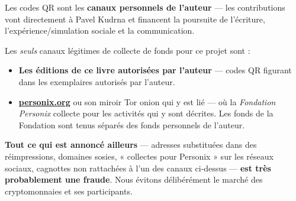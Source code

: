 \begin{minipage}[t]{0.60\textwidth}
\vspace{0pt}
\begin{mdframed}[
  linewidth=0.7pt,roundcorner=5pt,
  innerleftmargin=10pt,innerrightmargin=10pt,
  innertopmargin=8pt,innerbottommargin=8pt,
  skipabove=0pt,skipbelow=0pt,
  linecolor=cbwarning!50,backgroundcolor=cbwarning!5,
  nobreak=true,
  needspace=4\baselineskip,
]
\footnotesize
Les codes QR sont les \textbf{canaux personnels de l'auteur} --- les contributions vont directement à Pavel Kudrna et financent la poursuite de l'écriture, l'expérience/simulation sociale et la communication.

\smallskip
Les \emph{seuls} canaux légitimes de collecte de fonds pour ce projet sont :

\smallskip
\begin{itemize}
\setlength{\itemsep}{0pt}
\setlength{\topsep}{0pt}
\item \textbf{Les éditions de ce livre autorisées par l'auteur} --- codes QR figurant dans les exemplaires autorisés par l'auteur.
\item \href{https://personix.org}{\textbf{personix.org}} ou son miroir Tor onion qui y est lié --- où la \emph{Fondation Personix} collecte pour les activités qui y sont décrites. Les fonds de la Fondation sont tenus séparés des fonds personnels de l'auteur.
\end{itemize}

\smallskip
\textbf{Tout ce qui est annoncé ailleurs} --- adresses substituées dans des réimpressions, domaines sosies, « collectes pour Personix » sur les réseaux sociaux, cagnottes non rattachées à l'un des canaux ci-dessus --- \textbf{est très probablement une fraude}. Nous évitons délibérément le marché des cryptomonnaies et ses participants.
\end{mdframed}
\end{minipage}

\clearpage
